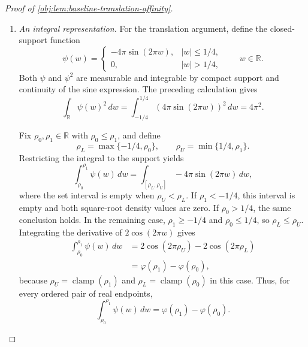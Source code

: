 \documentclass[11pt]{article}
\begin{document}
\begin{proof}[Proof of \cref{obj:lem:baseline-translation-affinity}]
\begin{enumerate}
\item \emph{An integral representation.}
For the translation argument, define the closed-support function
\[
\psi(w)=
\begin{cases}
-4\pi\sin(2\pi w),& |w|\le1/4,\\
0,& |w|>1/4,
\end{cases}
\qquad w\in\mathbb R.
\]
Both \(\psi\) and \(\psi^2\) are measurable and integrable by compact support and continuity of the sine expression. The preceding calculation gives
\[
\int_{\mathbb R}\psi(w)^2\,dw
=\int_{-1/4}^{1/4}(4\pi\sin(2\pi w))^2\,dw
=4\pi^2.
\]

Fix \(\rho_0,\rho_1\in\mathbb R\) with \(\rho_0\le\rho_1\), and define
\[
\rho_L=\max\{-1/4,\rho_0\},
\qquad
\rho_U=\min\{1/4,\rho_1\}.
\]
Restricting the integral to the support yields
\[
\int_{\rho_0}^{\rho_1}\psi(w)\,dw
=\int_{[\rho_L,\rho_U]}-4\pi\sin(2\pi w)\,dw,
\]
where the set interval is empty when \(\rho_U<\rho_L\).
If \(\rho_1<-1/4\), this interval is empty and both square-root density values are zero. If \(\rho_0>1/4\), the same conclusion holds. In the remaining case,
\(\rho_1\ge-1/4\) and \(\rho_0\le1/4\), so \(\rho_L\le\rho_U\). Integrating the derivative of \(2\cos(2\pi w)\) gives
\[
\begin{aligned}
\int_{\rho_0}^{\rho_1}\psi(w)\,dw
&=2\cos(2\pi\rho_U)-2\cos(2\pi\rho_L)\\
&=\varphi(\rho_1)-\varphi(\rho_0),
\end{aligned}
\]
because \(\rho_U=\operatorname{clamp}(\rho_1)\) and
\(\rho_L=\operatorname{clamp}(\rho_0)\) in this case. Thus, for every ordered pair of real endpoints,
\[
\int_{\rho_0}^{\rho_1}\psi(w)\,dw
=\varphi(\rho_1)-\varphi(\rho_0).
\]


\end{enumerate}
\end{proof}
\end{document}
